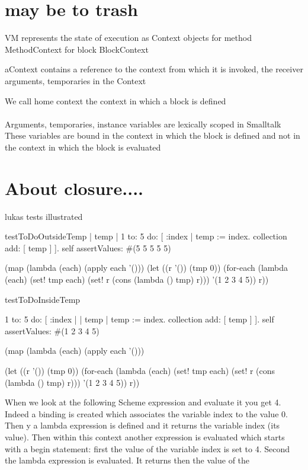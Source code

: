 \documentclass[a4paper,10pt,twoside]{book}
\begin{document}
\section{may be to trash}
VM represents the state of execution as Context objects
for method MethodContext
for block BlockContext

aContext contains a reference to the context from which it is invoked, the receiver arguments, temporaries in the Context

We call home context the context in which a block is defined


\paragraph{}
Arguments, temporaries, instance variables are lexically scoped in Smalltalk
These variables are bound in the context in which the block is defined and not in the context in which the block is evaluated


\section{About closure....}
lukas tests illustrated 

\begin{code}{}
testToDoOutsideTemp
	| temp |
	1 to: 5 do: [ :index | 
		temp := index. 
		collection add: [ temp ] ].
	self assertValues: #(5 5 5 5 5)

(map 
 (lambda (each)
   (apply each '()))
 (let ((r '()) 
       (tmp 0))
  (for-each (lambda (each)
              (set! tmp each)
              (set! r (cons (lambda () tmp) 
                            r)))
            '(1 2 3 4 5))
  r))


testToDoInsideTemp
	
	1 to: 5 do: [ :index | | temp |
		temp := index. 
		collection add: [ temp ] ].
	self assertValues: #(1 2 3 4 5)

(map 
 (lambda (each)
   (apply each '()))
 
 (let ((r '()) 
       (tmp 0))
  (for-each (lambda (each)
              (set! tmp each)
              (set! r (cons (lambda () tmp) 
                            r)))
            '(1 2 3 4 5))
  r))

\end{code}
When we look at the following Scheme expression and evaluate it you get 4. Indeed a binding is created 
which associates the variable index to the value 0. Then y a lambda expression is defined and it returns
 the variable index (its value). Then within this context another expression is evaluated which starts
with a begin statement: first the value of the variable index is set to 4. Second the lambda expression is 
evaluated. It returns then the value of the 
\end{document}
